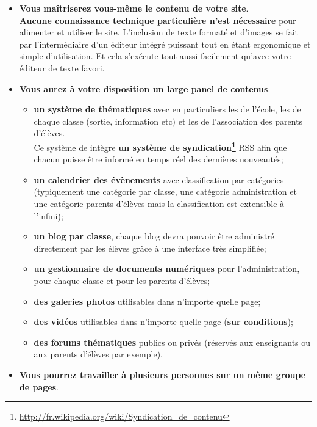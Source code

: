 \documentclass[]{extarticle}
\begin{document}
\begin{itemize}
\item \textbf{Vous maîtriserez vous-même le contenu de votre site}.\\
  \textbf{Aucune connaissance technique particulière n'est nécessaire} pour alimenter
  et utiliser le site. L'inclusion de texte formaté et d'images se
  fait par l'intermédiaire d'un éditeur intégré puissant tout en étant
  ergonomique et simple d'utilisation. Et cela s'exécute tout aussi
  facilement qu'avec votre éditeur de texte favori.

\item \textbf{Vous aurez à votre disposition un large panel de contenus}.
  \begin{itemize}
  \item \textbf{un système de \news thématiques} avec en
    particuliers les \news de l'école, les \news de
    chaque classe (sortie, information etc) et les \news de
    l'association des parents d'élèves.\\
    Ce système de \news intègre \textbf{un système de
      syndication\footnote{\url{http://fr.wikipedia.org/wiki/Syndication_de_contenu}}}
    \og{}RSS\fg{} afin que chacun puisse être informé en temps réel des
    dernières nouveautés;
  \item \textbf{un calendrier des évènements} avec classification par
    catégories (typiquement une catégorie par classe, une catégorie
    \og{}administration\fg{} et une catégorie \og{}parents
    d'élèves\fg{} mais la classification est extensible à l'infini);
  \item \textbf{un blog par classe}, chaque blog devra pouvoir être administré
    directement par les élèves grâce à une interface très simplifiée;
  \item \textbf{un gestionnaire de documents numériques} pour l'administration,
    pour chaque classe et pour les parents d'élèves;
  \item \textbf{des galeries photos} utilisables dans n'importe quelle page;
  \item \textbf{des vidéos} utilisables dans n'importe quelle page (\textbf{sur
      conditions});
  \item \textbf{des forums thématiques} publics ou privés (réservés aux
    enseignants ou aux parents d'élèves par exemple).
  \end{itemize}
\item \textbf{Vous pourrez travailler à plusieurs personnes sur un même
    groupe de pages}.\\

\end{itemize}
\end{document}
